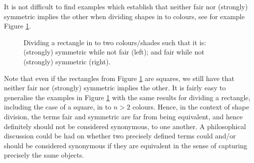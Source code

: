 It is not difficult to find examples which establish that neither fair nor (strongly) symmetric implies the other when dividing shapes in to colours, see for example Figure \ref{fig:cakecuts}.

\begin{figure}[!ht]
	\begin{center}
		\caption{Dividing a rectangle in to two colours/shades such that it is: (strongly) symmetric while not fair (left); and fair while not (strongly) symmetric (right).}
		\label{fig:cakecuts}
		\vspace{-0.5cm}
	\end{center}
\end{figure}	

Note that even if the rectangles from Figure \ref{fig:cakecuts} are squares, we still have that neither fair nor (strongly) symmetric implies the other. It is fairly easy to generalise the examples in Figure \ref{fig:cakecuts} with the same results for dividing a rectangle, including the case of a square, in to $n > 2$ colours. Hence, in the context of shape division, the terms fair and symmetric are far from being equivalent, and hence definitely should not be considered synonymous, to one another. A philosophical discussion could be had on whether two precisely defined terms could and/or should be considered synonymous if they are equivalent in the sense of capturing precisely the same objects.

